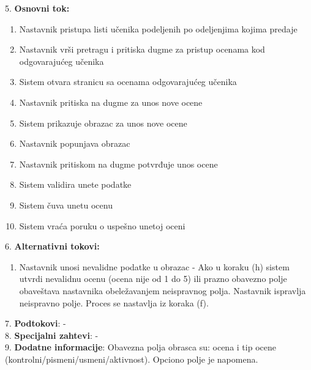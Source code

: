 \documentclass{article}
\begin{document}
5. \textbf{Osnovni tok:} 
\begin{enumerate} [label=(\alph*)]
\item Nastavnik pristupa listi učenika podeljenih po odeljenjima kojima predaje
\item Nastavnik vrši pretragu i pritiska dugme za pristup ocenama kod odgovarajućeg učenika
\item Sistem otvara stranicu sa ocenama odgovarajućeg učenika
\item Nastavnik pritiska na dugme za unos nove ocene
\item Sistem prikazuje obrazac za unos nove ocene
\item Nastavnik popunjava obrazac
\item Nastavnik pritiskom na dugme potvrđuje unos ocene
\item Sistem validira unete podatke
\item Sistem čuva unetu ocenu
\item Sistem vraća poruku o uspešno unetoj oceni
\end{enumerate}

6. \textbf{Alternativni tokovi:}
\begin{enumerate} [label=(\roman*)]
\item Nastavnik unosi nevalidne podatke u obrazac - Ako u koraku (h) sistem utvrdi nevalidnu ocenu (ocena nije od 1 do 5) ili prazno obavezno polje obaveštava nastavnika obeležavanjem neispravnog polja. Nastavnik ispravlja neispravno polje. Proces se nastavlja iz koraka (f).
\end{enumerate}

7. \textbf{Podtokovi}: - \\

8. \textbf{Specijalni zahtevi}: - \\

9. \textbf{Dodatne informacije}: Obavezna polja obrasca su: ocena i tip ocene (kontrolni/pismeni/usmeni/aktivnost). Opciono polje je napomena. \\
\end{document}
